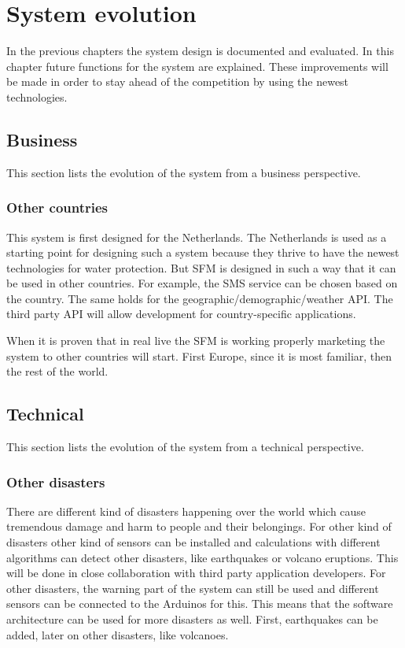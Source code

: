 \chapter{System evolution}

\label{ch:evolution}
In the previous chapters the system design is documented and evaluated. In this chapter future functions for the system are explained. These improvements will be made in order to stay ahead of the competition by using the newest technologies.

\section{Business}
This section lists the evolution of the system from a business perspective.

\subsection{Other countries}
This system is first designed for the Netherlands. The Netherlands is used as a starting point for designing such a system because they thrive to have the newest technologies for water protection. But SFM is designed in such a way that it can be used in other countries. For example, the SMS service can be chosen based on the country. The same holds for the geographic/demographic/weather API.
The third party API will allow development for country-specific applications.

When it is proven that in real live the SFM is working properly marketing the system to other countries will start. First Europe, since it is most familiar, then the rest of the world.


\section{Technical}
This section lists the evolution of the system from a technical perspective.
\subsection{Other disasters}
There are different kind of disasters happening over the world which cause tremendous damage and harm to people and their belongings. For other kind of disasters other kind of sensors can be installed and calculations with different algorithms can detect other disasters, like earthquakes or volcano eruptions. This will be done in close collaboration with third party application developers.
For other disasters, the warning part of the system can still be used and different sensors can be connected to the Arduinos for this. This means that the software architecture can be used for more disasters as well.
First, earthquakes can be added, later on other disasters, like volcanoes.

